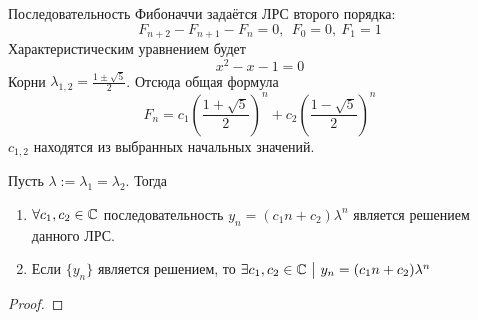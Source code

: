 \begin{enumerate}
	\begin{example}
		Последовательность Фибоначчи задаётся ЛРС второго порядка:
		\[
		F_{n + 2} - F_{n + 1} - F_n = 0,\ \ F_0 = 0,\ F_1 = 1
		\]
		Характеристическим уравнением будет
		\[
		x^2 - x - 1 = 0
		\]
		Корни $\lambda_{1, 2} = \frac{1 \pm \sqrt{5}}{2}$. Отсюда общая формула
		\[
		F_n = c_1\left(\frac{1 + \sqrt{5}}{2}\right)^n + c_2\left(\frac{1 - \sqrt{5}}{2}\right)^n
		\]
		$c_{1, 2}$ находятся из выбранных начальных значений.
	\end{example}

	\begin{theorem}
		Пусть $\lambda := \lambda_1 = \lambda_2$. Тогда
		\begin{enumerate}
			\item $\forall c_1, c_2 \in \mathbb{C}$ последовательность $y_n = (c_1n + c_2)\lambda^n$ является решением данного ЛРС.
			
			\item Если $\{y_n\}$ является решением, то $\exists c_1, c_2 \in \mathbb{C} \ \big|\  y_n = (c_1n + c_2)\lambda^n$
		\end{enumerate}
	\end{theorem}
	
	\begin{proof}
		
	\end{proof}
\end{enumerate}